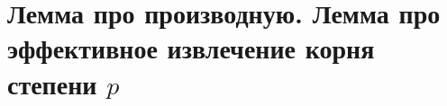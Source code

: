 \section{
 \texorpdfstring{Лемма про производную. Лемма про эффективное извлечение корня степени $p$}.
}

